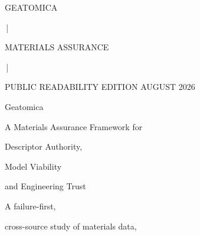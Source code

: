 \documentclass[11pt,a4paper,oneside]{report}
\begin{document}
\begin{titlepage}



\thispagestyle{empty}



\begin{center}



\vspace*{0.8cm}



{\small

\bfseries

\color{geoGold}

GEATOMICA

\,|\,

MATERIALS ASSURANCE

\,|\,

PUBLIC READABILITY EDITION \textbar{} AUGUST 2026

\par}



\vspace{0.85cm}



{\Huge

\bfseries

\color{geoBlue}

Geatomica

\par}



\vspace{0.22cm}



{\LARGE

\bfseries

\color{geoDark}

A Materials Assurance Framework for

Descriptor Authority,

Model Viability

and Engineering Trust

\par}



\vspace{0.55cm}



{\large

A failure-first,

cross-source study of materials data,

}
\end{center}
\end{titlepage}
\end{document}
